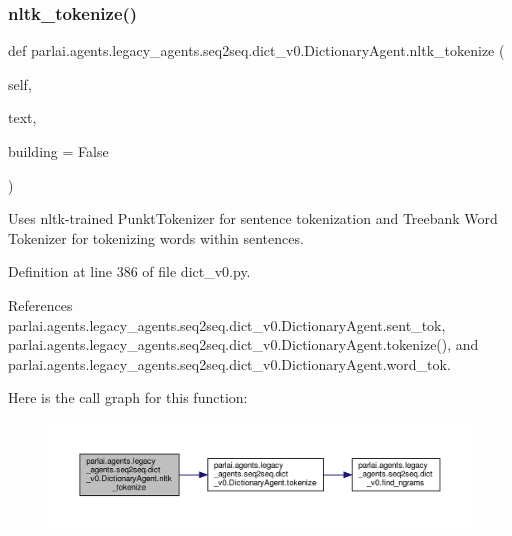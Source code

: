 \subsubsection{\texorpdfstring{nltk\+\_\+tokenize()}{nltk\_tokenize()}}
{\footnotesize\ttfamily def parlai.\+agents.\+legacy\+\_\+agents.\+seq2seq.\+dict\+\_\+v0.\+Dictionary\+Agent.\+nltk\+\_\+tokenize (\begin{DoxyParamCaption}\item[{}]{self,  }\item[{}]{text,  }\item[{}]{building = {\ttfamily False} }\end{DoxyParamCaption})}

\begin{DoxyVerb}Uses nltk-trained PunktTokenizer for sentence tokenization and
Treebank Word Tokenizer for tokenizing words within sentences.
\end{DoxyVerb}
 

Definition at line 386 of file dict\+\_\+v0.\+py.



References parlai.\+agents.\+legacy\+\_\+agents.\+seq2seq.\+dict\+\_\+v0.\+Dictionary\+Agent.\+sent\+\_\+tok, parlai.\+agents.\+legacy\+\_\+agents.\+seq2seq.\+dict\+\_\+v0.\+Dictionary\+Agent.\+tokenize(), and parlai.\+agents.\+legacy\+\_\+agents.\+seq2seq.\+dict\+\_\+v0.\+Dictionary\+Agent.\+word\+\_\+tok.

Here is the call graph for this function\+:
\nopagebreak
\begin{figure}[H]
\begin{center}
\leavevmode
\includegraphics[width=350pt]{classparlai_1_1agents_1_1legacy__agents_1_1seq2seq_1_1dict__v0_1_1DictionaryAgent_a67ebc0fd49a9bcb850ae3d693b29b304_cgraph}
\end{center}
\end{figure}
\mbox{\label{classparlai_1_1agents_1_1legacy__agents_1_1seq2seq_1_1dict__v0_1_1DictionaryAgent_a4f1667bb1484f0712678a8f679db6579}} 
